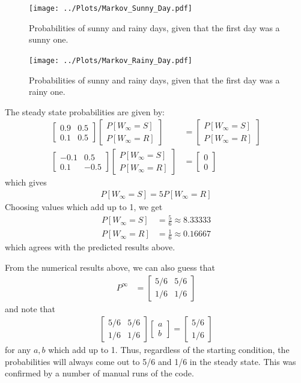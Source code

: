 \documentclass[twocolumn]{myarticle}
\newcommand{\mat}[1]{\begin{bmatrix}#1\end{bmatrix}}
\begin{document}
\begin{figure}[ht!]
    \begin{center}
    \texttt{[image: ../Plots/Markov\_Sunny\_Day.pdf]}
    \caption{%
    Probabilities of sunny and rainy days, given that the first day was a sunny one.
    }
    \label{fig:markov_sunny_day}
    \end{center}
\end{figure}

\begin{figure}[ht!]
    \begin{center}
    \texttt{[image: ../Plots/Markov\_Rainy\_Day.pdf]}
    \caption{%
    Probabilities of sunny and rainy days, given that the first day was a rainy one.
    }
    \label{fig:markov_rainy_day}
    \end{center}
\end{figure}

The steady state probabilities are given by:
\begin{align}
    \mat{0.9 & 0.5 \\ 0.1 & 0.5} \mat{P[W_\infty = S] \\ P[W_\infty = R]} &= \mat{P[W_\infty = S] \\ P[W_\infty = R]}
    \\
    \mat{-0.1 & 0.5 \\ 0.1 & -0.5} \mat{P[W_\infty = S] \\ P[W_\infty = R]} &= \mat{0 \\ 0}
\end{align}
which gives
\begin{align}
    P[W_\infty = S] = 5 P[W_\infty = R] 
\end{align}
Choosing values which add up to 1, we get
\begin{align}
    P[W_\infty = S] &= \frac{5}{6} \approx 8.33333
    \\
    P[W_\infty = R] &= \frac{1}{6} \approx 0.16667
\end{align}
which agrees with the predicted results above.

From the numerical results above, we can also guess that
\begin{align}
    P^\infty &= \mat{5/6 & 5/6 \\ 1/6 & 1/6}
\end{align}
and note that
\begin{align}
    \mat{5/6 & 5/6 \\ 1/6 & 1/6} \mat{a \\ b} = \mat{5/6 \\ 1/6}
\end{align}
for any $ a, b $ which add up to 1.
Thus, regardless of the starting condition, the probabilities will always come out to 5/6 and 1/6 in the steady state.
This was confirmed by a number of manual runs of the code.
\end{document}
